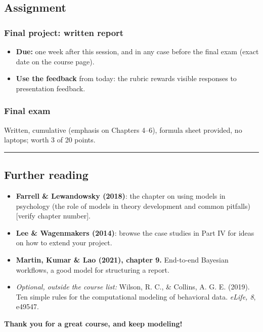 
\subsection{Assignment}

\subsubsection{Final project: written report}

\begin{itemize}
\tightlist
\item
  \textbf{Due:} one week after this session, and in any case before the
  final exam (exact date on the course page).
\item
  \textbf{Use the feedback} from today: the rubric rewards visible
  responses to presentation feedback.
\end{itemize}

\subsubsection{Final exam}

Written, cumulative (emphasis on Chapters 4--6), formula sheet provided,
no laptops; worth 3 of 20 points.

\begin{center}\rule{0.5\linewidth}{0.5pt}\end{center}

\subsection{Further reading}

\begin{itemize}
\tightlist
\item
  \textbf{Farrell \& Lewandowsky (2018)}: the chapter on using models in
  psychology (the role of models in theory development and common
  pitfalls) {[}verify chapter number{]}.
\item
  \textbf{Lee \& Wagenmakers (2014)}: browse the case studies in Part IV
  for ideas on how to extend your project.
\item
  \textbf{Martin, Kumar \& Lao (2021), chapter 9.} End-to-end Bayesian
  workflows, a good model for structuring a report.
\item
  \emph{Optional, outside the course list:} Wilson, R. C., \& Collins,
  A. G. E. (2019). Ten simple rules for the computational modeling of
  behavioral data. \emph{eLife, 8}, e49547.
\end{itemize}

\textbf{Thank you for a great course, and keep modeling!}
